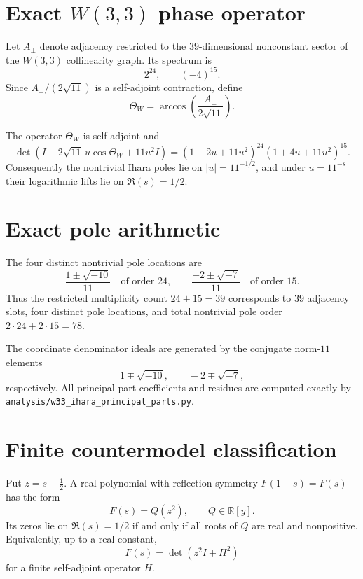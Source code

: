 \section{Exact $W(3,3)$ phase operator}

Let $A_\perp$ denote adjacency restricted to the $39$-dimensional nonconstant
sector of the $W(3,3)$ collinearity graph.  Its spectrum is
\[
  2^{24},\qquad (-4)^{15}.
\]
Since $A_\perp/(2\sqrt{11})$ is a self-adjoint contraction, define
\[
  \Theta_W=\arccos\!\left(\frac{A_\perp}{2\sqrt{11}}\right).
\]

\begin{theorem}
The operator $\Theta_W$ is self-adjoint and
\[
 \det\!\left(
 I-2\sqrt{11}\,u\cos\Theta_W+11u^2I
 \right)
 =(1-2u+11u^2)^{24}(1+4u+11u^2)^{15}.
\]
Consequently the nontrivial Ihara poles lie on $|u|=11^{-1/2}$, and under
$u=11^{-s}$ their logarithmic lifts lie on $\Re(s)=1/2$.
\end{theorem}

\section{Exact pole arithmetic}

The four distinct nontrivial pole locations are
\[
  \frac{1\pm\sqrt{-10}}{11}
  \quad\text{of order }24,
  \qquad
  \frac{-2\pm\sqrt{-7}}{11}
  \quad\text{of order }15.
\]
Thus the restricted multiplicity count $24+15=39$ corresponds to $39$
adjacency slots, four distinct pole locations, and total nontrivial pole order
$2\cdot24+2\cdot15=78$.

The coordinate denominator ideals are generated by the conjugate norm-$11$
elements
\[
  1\mp\sqrt{-10},
  \qquad
  -2\mp\sqrt{-7},
\]
respectively.  All principal-part coefficients and residues are computed
exactly by \texttt{analysis/w33\_ihara\_principal\_parts.py}.

\section{Finite countermodel classification}

Put $z=s-\tfrac12$.  A real polynomial with reflection symmetry
$F(1-s)=F(s)$ has the form
\[
  F(s)=Q(z^2),\qquad Q\in\mathbb R[y].
\]
Its zeros lie on $\Re(s)=1/2$ if and only if all roots of $Q$ are real and
nonpositive.  Equivalently, up to a real constant,
\[
  F(s)=\det(z^2I+H^2)
\]
for a finite self-adjoint operator $H$.

